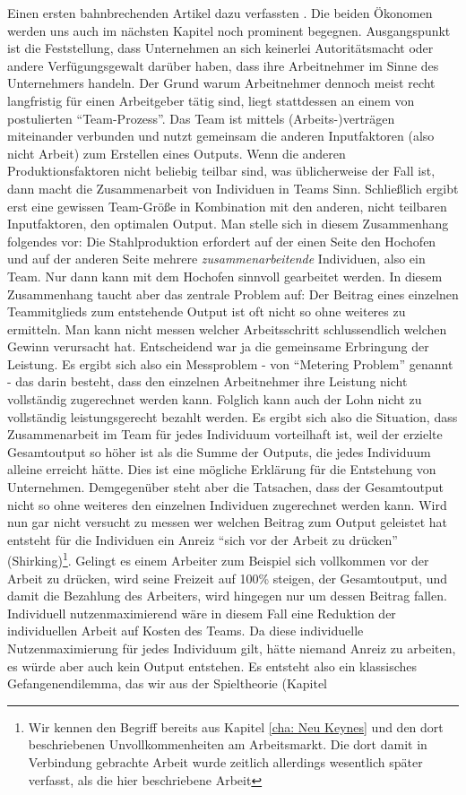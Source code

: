 Einen ersten bahnbrechenden Artikel dazu verfassten \textcite{Alchian1972}. Die beiden Ökonomen werden uns auch im nächsten Kapitel noch prominent begegnen. Ausgangspunkt ist die Feststellung, dass Unternehmen an sich keinerlei Autoritätsmacht oder andere Verfügungsgewalt darüber haben, dass ihre Arbeitnehmer im Sinne des Unternehmers handeln. Der Grund warum Arbeitnehmer dennoch meist recht langfristig für einen Arbeitgeber tätig sind, liegt stattdessen an einem von \textcite[S. 778]{Alchian1972} postulierten "`Team-Prozess"'. Das Team ist mittels (Arbeits-)verträgen miteinander verbunden und nutzt gemeinsam die anderen Inputfaktoren (also nicht Arbeit) zum Erstellen eines Outputs. Wenn die anderen Produktionsfaktoren nicht beliebig teilbar sind, was üblicherweise der Fall ist, dann macht die Zusammenarbeit von Individuen in Teams Sinn. Schließlich ergibt erst eine gewissen Team-Größe in Kombination mit den anderen, nicht teilbaren Inputfaktoren, den optimalen Output. Man stelle sich in diesem Zusammenhang folgendes vor: Die Stahlproduktion erfordert auf der einen Seite den Hochofen und auf der anderen Seite mehrere \textit{zusammenarbeitende} Individuen, also ein Team. Nur dann kann mit dem Hochofen sinnvoll gearbeitet werden. In diesem Zusammenhang taucht aber das zentrale Problem auf: Der Beitrag eines einzelnen Teammitglieds zum entstehende Output ist oft nicht so ohne weiteres zu ermitteln. Man kann nicht messen welcher Arbeitsschritt schlussendlich welchen Gewinn verursacht hat. Entscheidend war ja die gemeinsame Erbringung der Leistung. Es ergibt sich also ein Messproblem - von \textcite[S. 778]{Alchian1972} "`Metering Problem"' genannt - das darin besteht, dass den einzelnen Arbeitnehmer ihre Leistung nicht vollständig zugerechnet werden kann. Folglich kann auch der Lohn nicht zu vollständig leistungsgerecht bezahlt werden. Es ergibt sich also die Situation, dass Zusammenarbeit im Team für jedes Individuum vorteilhaft ist, weil der erzielte Gesamtoutput so höher ist als die Summe der Outputs, die jedes Individuum alleine erreicht hätte. Dies ist eine mögliche Erklärung für die Entstehung von Unternehmen. Demgegenüber steht aber die Tatsachen, dass der Gesamtoutput nicht so ohne weiteres den einzelnen Individuen zugerechnet werden kann. Wird nun gar nicht versucht zu messen wer welchen Beitrag zum Output geleistet hat entsteht für die Individuen ein Anreiz "`sich vor der Arbeit zu drücken"' (Shirking)\footnote{Wir kennen den Begriff bereits aus Kapitel \ref{cha: Neu Keynes} und den dort beschriebenen Unvollkommenheiten am Arbeitsmarkt. Die dort damit in Verbindung gebrachte Arbeit \textcite{ShapiroStiglitz1984} wurde zeitlich allerdings wesentlich später verfasst, als die hier beschriebene Arbeit}. Gelingt es einem Arbeiter zum Beispiel sich vollkommen vor der Arbeit zu drücken, wird seine Freizeit auf 100\% steigen, der Gesamtoutput, und damit die Bezahlung des Arbeiters, wird hingegen nur um dessen Beitrag fallen. Individuell nutzenmaximierend wäre in diesem Fall eine Reduktion der individuellen Arbeit auf Kosten des Teams. Da diese individuelle Nutzenmaximierung für jedes Individuum gilt, hätte niemand Anreiz zu arbeiten, es würde aber auch kein Output entstehen. Es entsteht also ein klassisches Gefangenendilemma, das wir aus der Spieltheorie (Kapitel 